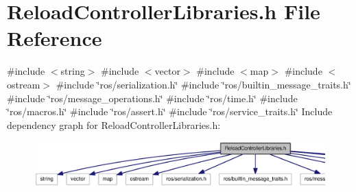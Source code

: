 \section{\-Reload\-Controller\-Libraries.\-h \-File \-Reference}
\label{ReloadControllerLibraries_8h}
{\ttfamily \#include $<$string$>$}\*
{\ttfamily \#include $<$vector$>$}\*
{\ttfamily \#include $<$map$>$}\*
{\ttfamily \#include $<$ostream$>$}\*
{\ttfamily \#include \char`\"{}ros/serialization.\-h\char`\"{}}\*
{\ttfamily \#include \char`\"{}ros/builtin\-\_\-message\-\_\-traits.\-h\char`\"{}}\*
{\ttfamily \#include \char`\"{}ros/message\-\_\-operations.\-h\char`\"{}}\*
{\ttfamily \#include \char`\"{}ros/time.\-h\char`\"{}}\*
{\ttfamily \#include \char`\"{}ros/macros.\-h\char`\"{}}\*
{\ttfamily \#include \char`\"{}ros/assert.\-h\char`\"{}}\*
{\ttfamily \#include \char`\"{}ros/service\-\_\-traits.\-h\char`\"{}}\*
\-Include dependency graph for \-Reload\-Controller\-Libraries.\-h\-:
\nopagebreak
\begin{figure}[H]
\begin{center}
\leavevmode
\includegraphics[width=350pt]{ReloadControllerLibraries_8h__incl}
\end{center}
\end{figure}
